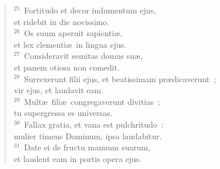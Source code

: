 \begin{flushleft}
\begin{verse}
${}^{25}$~Fortitudo et decor indumentum ejus,\\ et ridebit in die novissimo.\\
${}^{26}$~Os suum aperuit sapienti\ae ,\\ et lex clementi\ae\ in lingua ejus.\\
${}^{27}$~Consideravit semitas domus su\ae ,\\ et panem otiosa non comedit.\\
${}^{28}$~Surrexerunt filii ejus, et beatissimam pr\ae dicaverunt~;\\ vir ejus, et laudavit eam.\\
${}^{29}$~Mult\ae\ fili\ae\ congregaverunt divitias~;\\ tu supergressa es universas.\\
${}^{30}$~Fallax gratia, et vana est pulchritudo~:\\ mulier timens Dominum, ipsa laudabitur.\\
${}^{31}$~Date ei de fructu manuum suarum,\\ et laudent eam in portis opera ejus.\end{verse}\end{flushleft}


